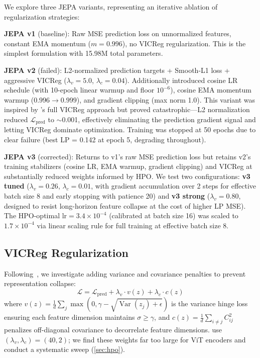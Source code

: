 \documentclass{article}
\begin{document}
We explore three JEPA variants, representing an iterative ablation of regularization strategies:

\textbf{JEPA v1} (baseline): Raw MSE prediction loss on unnormalized features, constant EMA momentum ($m{=}0.996$), no VICReg regularization. This is the simplest formulation with 15.98M total parameters.

\textbf{JEPA v2} (failed): L2-normalized prediction targets + Smooth-L1 loss + aggressive VICReg ($\lambda_v{=}5.0$, $\lambda_c{=}0.04$). Additionally introduced cosine LR schedule (with 10-epoch linear warmup and floor $10^{-6}$), cosine EMA momentum warmup ($0.996 \to 0.999$), and gradient clipping (max norm 1.0). This variant was inspired by \citet{qu2025representation}'s full VICReg approach but proved catastrophic---L2 normalization reduced $\mathcal{L}_{\text{pred}}$ to $\sim$0.001, effectively eliminating the prediction gradient signal and letting VICReg dominate optimization. Training was stopped at 50 epochs due to clear failure (best LP = 0.142 at epoch 5, degrading throughout).

\textbf{JEPA v3} (corrected): Returns to v1's raw MSE prediction loss but retains v2's training stabilizers (cosine LR, EMA warmup, gradient clipping) and VICReg at substantially reduced weights informed by HPO. We test two configurations: \textbf{v3 tuned} ($\lambda_v{=}0.26$, $\lambda_c{=}0.01$, with gradient accumulation over 2 steps for effective batch size 8 and early stopping with patience 20) and \textbf{v3 strong} ($\lambda_v{=}0.80$, designed to resist long-horizon feature collapse at the cost of higher LP MSE). The HPO-optimal lr$=3.4{\times}10^{-4}$ (calibrated at batch size 16) was scaled to $1.7{\times}10^{-4}$ via linear scaling rule for full training at effective batch size 8.

\subsection{VICReg Regularization}

Following~\citet{bardes2021vicreg, qu2025representation}, we investigate adding variance and covariance penalties to prevent representation collapse:
\begin{equation}
    \mathcal{L} = \mathcal{L}_{\text{pred}} + \lambda_v \cdot v(z) + \lambda_c \cdot c(z)
\end{equation}
where $v(z) = \frac{1}{d}\sum_{j} \max(0, \gamma - \sqrt{\operatorname{Var}(z_j) + \epsilon})$ is the variance hinge loss ensuring each feature dimension maintains $\sigma \geq \gamma$, and $c(z) = \frac{1}{d}\sum_{i \neq j} C_{ij}^2$ penalizes off-diagonal covariance to decorrelate feature dimensions. \citet{qu2025representation} use $(\lambda_v, \lambda_c) = (40, 2)$; we find these weights far too large for ViT encoders and conduct a systematic sweep (\cref{sec:hpo}).
\end{document}
